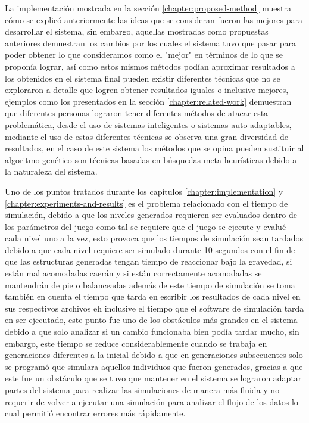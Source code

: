 La implementación mostrada en la sección \ref{chapter:proposed-method} muestra
cómo se explicó anteriormente las ideas que se consideran fueron las mejores
para desarrollar el sistema, sin embargo, aquellas mostradas como propuestas
anteriores demuestran los cambios por los cuales el sistema tuvo que pasar para
poder obtener lo que consideramos como el "mejor" en términos de lo que se
proponía lograr, así como estos mismos métodos podían aproximar resultados a los
obtenidos en el sistema final pueden existir diferentes técnicas que no se
exploraron a detalle que logren obtener resultados iguales o inclusive mejores,
ejemplos como los presentados en la sección \ref{chapter:related-work}
demuestran que diferentes personas lograron tener diferentes métodos de atacar
esta problemática, desde el uso de sistemas inteligentes o sistemas
auto-adaptables, mediante el uso de estas diferentes técnicas se observa una
gran diversidad de resultados, en el caso de este sistema los métodos que se
opina pueden sustituir al algoritmo genético son técnicas basadas en búsquedas
meta-heurísticas debido a la naturaleza del sistema.

Uno de los puntos tratados durante los capítulos \ref{chapter:implementation}
y \ref{chapter:experiments-and-results} es el problema relacionado con el tiempo
de simulación, debido a que los niveles generados requieren ser evaluados dentro
de los parámetros del juego como tal se requiere que el juego se ejecute y
evalué cada nivel uno a la vez, esto provoca que los tiempos de simulación sean
tardados debido a que cada nivel requiere ser simulado durante 10 segundos con
el fin de que las estructuras generadas tengan tiempo de reaccionar bajo la
gravedad, si están mal acomodadas caerán y si están correctamente acomodadas se
mantendrán de pie o balanceadas además de este tiempo de simulación se toma
también en cuenta el tiempo que tarda en escribir los resultados de cada nivel
en sus respectivos archivos eh inclusive el tiempo que el software de simulación
tarda en ser ejecutado, este punto fue uno de los obstáculos más grandes en el
sistema debido a que solo analizar si un cambio funcionaba bien podía tardar
mucho, sin embargo, este tiempo se reduce considerablemente cuando se trabaja en
generaciones diferentes a la inicial debido a que en generaciones subsecuentes
solo se programó que simulara aquellos individuos que fueron generados, gracias
a que este fue un obstáculo que se tuvo que mantener en el sistema se lograron
adaptar partes del sistema para realizar las simulaciones de manera más fluida y
no requerir de volver a ejecutar una simulación para analizar el flujo de los
datos lo cual permitió encontrar errores más rápidamente.

